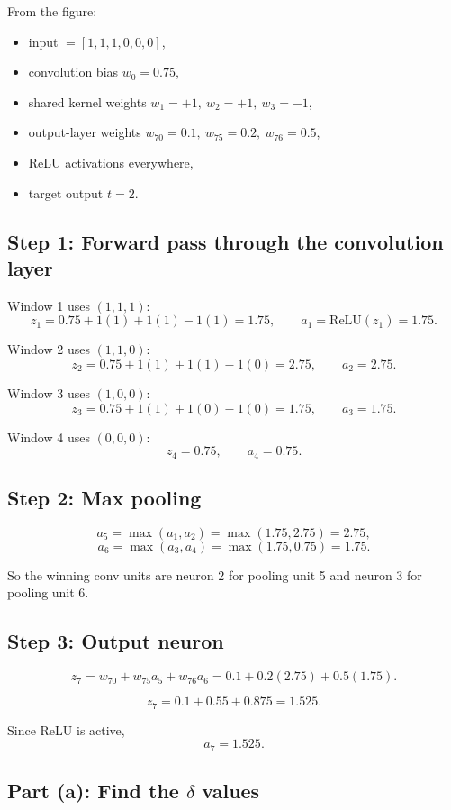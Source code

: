 \documentclass[11pt]{article}
\begin{document}
From the figure:
\begin{itemize}
    \item input \(=[1,1,1,0,0,0]\),
    \item convolution bias \(w_0=0.75\),
    \item shared kernel weights \(w_1=+1,\ w_2=+1,\ w_3=-1\),
    \item output-layer weights \(w_{70}=0.1,\ w_{75}=0.2,\ w_{76}=0.5\),
    \item ReLU activations everywhere,
    \item target output \(t=2\).
\end{itemize}

\subsection*{Step 1: Forward pass through the convolution layer}

Window 1 uses \((1,1,1)\):
\[
    z_1 = 0.75 + 1(1) + 1(1) - 1(1) = 1.75,
    \qquad
    a_1=\text{ReLU}(z_1)=1.75.
\]

Window 2 uses \((1,1,0)\):
\[
    z_2 = 0.75 + 1(1) + 1(1) - 1(0) = 2.75,
    \qquad
    a_2=2.75.
\]

Window 3 uses \((1,0,0)\):
\[
    z_3 = 0.75 + 1(1) + 1(0) - 1(0) = 1.75,
    \qquad
    a_3=1.75.
\]

Window 4 uses \((0,0,0)\):
\[
    z_4 = 0.75,
    \qquad
    a_4=0.75.
\]

\subsection*{Step 2: Max pooling}

\[
    a_5 = \max(a_1,a_2)=\max(1.75,2.75)=2.75,
\]
\[
    a_6 = \max(a_3,a_4)=\max(1.75,0.75)=1.75.
\]

So the winning conv units are neuron 2 for pooling unit 5 and neuron 3 for
pooling unit 6.

\subsection*{Step 3: Output neuron}

\[
    z_7 = w_{70} + w_{75}a_5 + w_{76}a_6
    = 0.1 + 0.2(2.75) + 0.5(1.75).
\]

\[
    z_7 = 0.1 + 0.55 + 0.875 = 1.525.
\]

Since ReLU is active,
\[
    a_7 = 1.525.
\]

\subsection*{Part (a): Find the \(\delta\) values}
\end{document}
